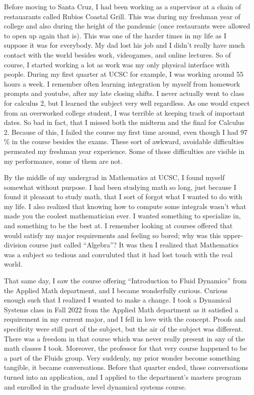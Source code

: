 \documentclass{article}
\begin{document}
Before moving to Santa Cruz, I had been working as a supervisor at a chain of restauarants called Rubios Coastal Grill. This was during my freshman year of college  and also during the height of the pandemic (once restaurants were allowed to open up again that is). This was one of the harder times in my life as I suppose it was for everybody. My dad lost his job and I didn't really have much contact with the world besides work, videogames, and online lectures. So of course, I started working a lot as work was my only physical interface with people. During my first quarter at UCSC for example, I was working around 55 hours a week. I remember often learning integration by myself from homework prompts and youtube, after my late closing shifts. I never actually went to class for calculus 2, but I learned the subject very well regardless. As one would expect from an overworked college student, I was terrible at keeping track of important dates. So bad in fact, that I missed both the midterm and the final for Calculus 2. Because of this, I failed the course my first time around, even though I had 97$\%$ in the course besides the exams. These sort of awkward, avoidable difficulties permeated my freshman year experience. Some of those difficulties are visible in my performance, some of them are not. 

By the middle of my undergrad in Mathematics at UCSC, I found myself somewhat without purpose. I had been studying math so long, just because I found it pleasant to study math, that I sort of forgot what I wanted to do with my life. I also realized that knowing how to compute some integrals wasn't what made you the coolest mathematician ever. I wanted something to specialize in, and something to be the best at. I remember looking at courses offered that would satisfy my major requirements and feeling so bored; why was this upper-division course just called ``Algebra''? It was then I realized that Mathematics was a subject so tedious and convuluted that it had lost touch with the real world. 

That same day, I saw the course offering ``Introduction to Fluid Dynamics'' from the Applied Math department, and I became wonderfully curious.  Curious enough such that I realized I wanted to make a change. I took a Dynamical Systems class in Fall 2022 from the Applied Math department as it satisfied a requirement in my current major, and I fell in love with the concept. Proofs and specificity were still part of the subject, but the air of the subject was different. There was a freedom in that course which was never really present in any of the math classes I took. Moreover, the professor for that very course happened to be a part of the Fluids group. Very suddenly, my prior wonder become something tangible, it became conversations. Before that quarter ended, those conversations turned into an application, and I applied to the department's masters program and enrolled in the graduate level dynamical systems course. 
\end{document}
